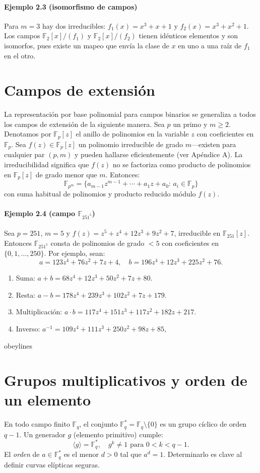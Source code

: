 \paragraph{Ejemplo 2.3 (isomorfismo de campos)}
Para $m=3$ hay dos irreducibles: $f_1(x)=x^3+x+1$ y $f_2(x)=x^3+x^2+1$. Los campos $\mathbb{F}_2[x]/(f_1)$ y $\mathbb{F}_2[x]/(f_2)$ tienen idénticos elementos y son isomorfos, pues existe un mapeo que envía la clase de $x$ en uno a una raíz de $f_1$ en el otro.

\section{Campos de extensión}
La representación por base polinomial para campos binarios se generaliza a todos los campos de extensión de la siguiente manera. Sea $p$ un primo y $m\ge2$. Denotamos por $\mathbb{F}_p[z]$ el anillo de polinomios en la variable $z$ con coeficientes en $\mathbb{F}_p$. Sea $f(z)\in\mathbb{F}_p[z]$ un polinomio irreducible de grado $m$—existen para cualquier par $(p,m)$ y pueden hallarse eficientemente (ver Apéndice A). La irreducibilidad significa que $f(z)$ no se factoriza como producto de polinomios en $\mathbb{F}_p[z]$ de grado menor que $m$. Entonces:
\[
  \mathbb{F}_{p^m}=\{a_{m-1}z^{m-1}+\cdots+a_1z+a_0:\,a_i\in\mathbb{F}_p\}
\]
con suma habitual de polinomios y producto reducido módulo $f(z)$.

\paragraph{Ejemplo 2.4 (campo $\mathbb{F}_{251^5}$)}
Sea $p=251$, $m=5$ y $f(z)=z^5+z^4+12z^3+9z^2+7$, irreducible en $\mathbb{F}_{251}[z]$. Entonces $\mathbb{F}_{251^5}$ consta de polinomios de grado \(<5\) con coeficientes en $\{0,1,\dots,250\}$. Por ejemplo, sean:
\[
  a=123z^4+76z^2+7z+4,\quad b=196z^4+12z^3+225z^2+76.
\]
\begin{enumerate}
  \item Suma: $a+b=68z^4+12z^3+50z^2+7z+80.$
  \item Resta: $a-b=178z^4+239z^3+102z^2+7z+179.$
  \item Multiplicación: $a\cdot b=117z^4+151z^3+117z^2+182z+217.$
  \item Inverso: $a^{-1}=109z^4+111z^3+250z^2+98z+85,$
\end{enumerate}
obeylines

\section{Grupos multiplicativos y orden de un elemento}
En todo campo finito $\mathbb{F}_q$, el conjunto $\mathbb{F}_q^*=\mathbb{F}_q\setminus\{0\}$ es un grupo cíclico de orden $q-1$. Un generador $g$ (elemento primitivo) cumple:
\[
  \langle g\rangle=\mathbb{F}_q^*,\quad g^k\neq1\text{ para }0<k<q-1.
\]
El \emph{orden} de $a\in\mathbb{F}_q^*$ es el menor $d>0$ tal que $a^d=1$. Determinarlo es clave al definir curvas elípticas seguras.
